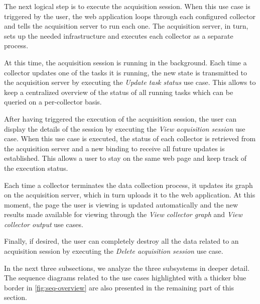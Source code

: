 The next logical step is to execute the acquisition session. When this use case is triggered by the user, the web application loops through each configured collector and tells the acquisition server to run each one. The acquisition server, in turn, sets up the needed infrastructure and executes each collector as a separate process.

At this time, the acquisition session is running in the background. Each time a collector updates one of the tasks it is running, the new state is transmitted to the acquisition server by executing the \emph{Update task status} use case. This allows to keep a centralized overview of the status of all running tasks which can be queried on a per-collector basis.

After having triggered the execution of the acquisition session, the user can display the details of the session by executing the \emph{View acquisition session} use case. When this use case is executed, the status of each collector is retrieved from the acquisition server and a new binding to receive all future updates is established. This allows a user to stay on the same web page and keep track of the execution status.

Each time a collector terminates the data collection process, it updates its graph on the acquisition server, which in turn uploads it to the web application. At this moment, the page the user is viewing is updated automatically and the new results made available for viewing through the \emph{View collector graph} and \emph{View collector output} use cases.

Finally, if desired, the user can completely destroy all the data related to an acquisition session by executing the \emph{Delete acquisition session} use case.

In the next three subsections, we analyze the three subsystems in deeper detail. The sequence diagrams related to the use cases highlighted with a thicker blue border in \vref{fig:seq-overview} are also presented in the remaining part of this section.


